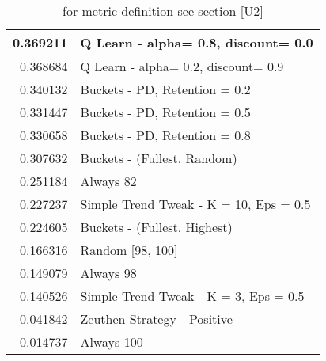 \begin{table}[!hbtp]
\begin{footnotesize}
\begin{tabular}{|r|l|}
0.369211 & Q Learn - alpha= 0.8, discount= 0.0\\ \hline
0.368684 & Q Learn - alpha= 0.2, discount= 0.9\\ \hline
0.340132 & Buckets - PD, Retention = 0.2\\ \hline
0.331447 & Buckets - PD, Retention = 0.5\\ \hline
0.330658 & Buckets - PD, Retention = 0.8\\ \hline
0.307632 & Buckets - (Fullest, Random)\\ \hline
0.251184 & Always 82\\ \hline
0.227237 & Simple Trend Tweak - K = 10, Eps = 0.5\\ \hline
0.224605 & Buckets - (Fullest, Highest)\\ \hline
0.166316 & Random [98, 100]\\ \hline
0.149079 & Always 98\\ \hline
0.140526 & Simple Trend Tweak - K = 3, Eps = 0.5\\ \hline
0.041842 & Zeuthen Strategy - Positive\\ \hline
0.014737 & Always 100\\ \hline
\end{tabular}
\caption{for metric definition see section \eqref{U2}}
\end{footnotesize}
\end{table}

